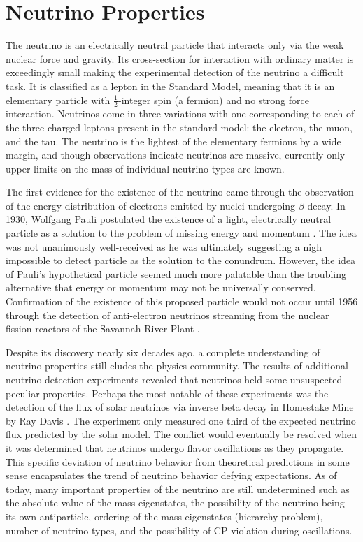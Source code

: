 \documentclass{gatech-thesis}
\begin{document}
\chapter{Neutrino Properties}
The neutrino is an electrically neutral particle that interacts only via the weak nuclear force and gravity. Its cross-section for interaction with ordinary matter is exceedingly small making the experimental detection of the neutrino a difficult task. It is classified as a lepton in the Standard Model, meaning that it is an elementary particle with $\frac{1}{2}$-integer spin (a fermion) and no strong force interaction. Neutrinos come in three variations with one corresponding to each of the three charged leptons present in the standard model: the electron, the muon, and the tau. The neutrino is the lightest of the  elementary fermions by a wide margin, and though observations indicate neutrinos are massive, currently only upper limits on the mass of individual neutrino types are known.

The first evidence for the existence of the neutrino came through the observation of the energy distribution of electrons emitted by nuclei undergoing $\beta$-decay. In 1930, Wolfgang Pauli postulated the existence of a light, electrically neutral particle as a solution to the problem of missing energy and momentum \cite{PauliLetter}. The idea was not unanimously well-received as he was ultimately suggesting a nigh impossible to detect particle as the solution to the conundrum. However, the idea of Pauli's hypothetical particle seemed much more palatable than the troubling alternative that energy or momentum may not be universally conserved. Confirmation of the existence of this proposed particle would not occur until 1956 through the detection of anti-electron neutrinos streaming from the nuclear fission reactors of the Savannah River Plant \cite{1956Sci...124..103C}.

Despite its discovery nearly six decades ago, a complete understanding of neutrino properties still eludes the physics community. The results of additional neutrino detection experiments revealed that neutrinos held some unsuspected peculiar properties. Perhaps the most notable of these experiments was the detection of the flux of solar neutrinos via inverse beta decay in Homestake Mine by Ray Davis \cite{PhysRevLett.20.1205}. The experiment only measured one third of the expected neutrino flux predicted by the solar model. The conflict would eventually be resolved when it was determined that neutrinos undergo flavor oscillations as they propagate. This specific deviation of neutrino behavior from theoretical predictions in some sense encapsulates the trend of neutrino behavior defying expectations. As of today, many important properties of the neutrino are still undetermined such as the absolute value of the mass eigenstates, the possibility of the neutrino being its own antiparticle, ordering of the mass eigenstates (hierarchy problem), number of neutrino types, and the possibility of CP violation during oscillations. 
\end{document}
